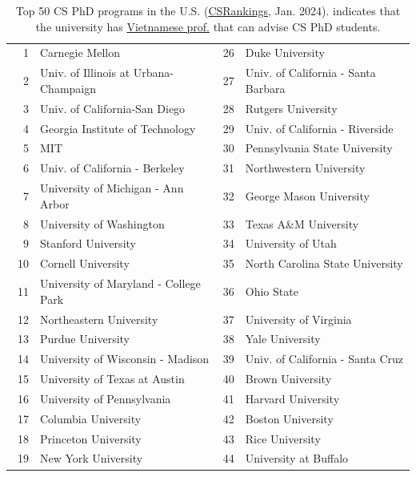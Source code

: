 \documentclass[oneside,11pt]{book}
\newcommand{\red}[1]{{\color{red}{#1}}}
\begin{document}
\begin{table}
  \centering
  \small
  \caption{Top 50 CS PhD programs in the U.S. (\href{https://csrankings.org}{CSRankings}, Jan. 2024). \red{$^*$} indicates that the university has \href{https://github.com/dynaroars/dynaroars.github.io/wiki/Viet-CS-Profs-US}{Vietnamese prof.} that can advise CS PhD students.}\label{tab:ranking}
  \begin{tabular}{rl|rl}
    \toprule
    1 & Carnegie Mellon & 26 & Duke University \\
    2 & Univ. of Illinois at Urbana-Champaign\red{$^*$}  & 27 & Univ. of California - Santa Barbara \\  
    3 & Univ. of California-San Diego & 28 & Rutgers University\red{$^*$} \\
    4 & Georgia Institute of Technology & 29 & Univ. of California - Riverside\\
    5 & MIT                            & 30 & Pennsylvania State University  \\
    6 & Univ. of California - Berkeley& 31 & Northwestern University\\
    7 & University of Michigan - Ann Arbor\red{$^*$}   & 32& George Mason University\red{$^*$}\\  
    8 & University of Washington      &33 &  Texas A\&M University\red{$^*$} \\
    9 &  Stanford University  &34&  University of Utah \\
    10 & Cornell University  & 35 &  North Carolina State University\\\  
    11 & University of Maryland - College Park &  36& Ohio State \\ 
    12 & Northeastern University\red{$^*$} &37& University of Virginia  \\ 
    13 & Purdue University &38& Yale University \\ 
    14 & University of Wisconsin - Madison\red{$^*$} &39 & Univ. of California - Santa Cruz \\
    15 & University of Texas at Austin &40& Brown University \\ 
    16 & University of Pennsylvania &41 & Harvard University \\
    17 & Columbia University\red{$^*$} &42 & Boston University  \\
    18 & Princeton University\red{$^*$}  & 43& Rice University\\
    19 & New York University  & 44&  University at Buffalo\red{$^*$}\\

\end{tabular}
\end{table}
\end{document}
